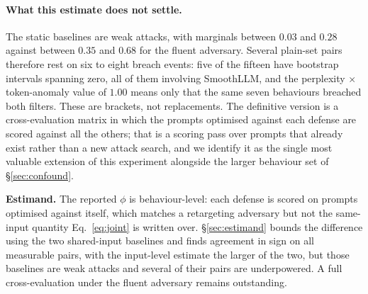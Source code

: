 \paragraph{What this estimate does not settle.}
The static baselines are weak attacks, with marginals between $0.03$ and $0.28$ against
between $0.35$ and $0.68$ for the fluent adversary. Several plain-set pairs therefore rest on
six to eight breach events: five of the fifteen have bootstrap intervals spanning zero, all
of them involving SmoothLLM, and the perplexity $\times$ token-anomaly value of $1.00$ means
only that the same seven behaviours breached both filters. These are brackets, not
replacements. The definitive version is a cross-evaluation matrix in which the prompts
optimised against each defense are scored against all the others; that is a scoring pass over
prompts that already exist rather than a new attack search, and we identify it as the single
most valuable extension of this experiment alongside the larger behaviour set of
\S\ref{sec:confound}.


\textbf{Estimand.} The reported $\phi$ is behaviour-level: each defense is scored on prompts
optimised against itself, which matches a retargeting adversary but not the same-input
quantity Eq.~\eqref{eq:joint} is written over. \S\ref{sec:estimand} bounds the difference
using the two shared-input baselines and finds agreement in sign on all measurable pairs,
with the input-level estimate the larger of the two, but those baselines are weak attacks and
several of their pairs are underpowered. A full cross-evaluation under the fluent adversary
remains outstanding.
